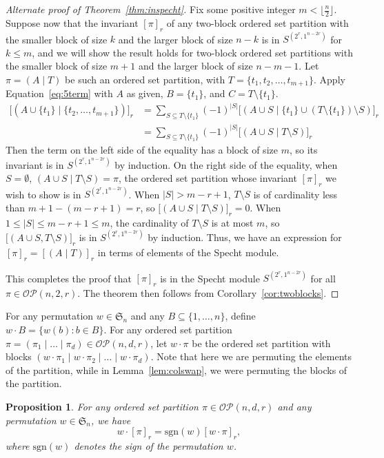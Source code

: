\documentclass[10pt]{amsart}
\theoremstyle{definition}
\theoremstyle{plain}
\theoremstyle{plain}
\newtheorem{proposition}[cdrthm]{Proposition}
\theoremstyle{definition}
\theoremstyle{remark}
\theoremstyle{plain}
\theoremstyle{plain}
\theoremstyle{plain}
\numberwithin{equation}{section}
\newcommand{\sgn}{\mathrm{sgn}}
\newcommand{\ordsetpart}{\mathcal{OP}}
\begin{document}
\begin{proof}[Alternate proof of Theorem~\ref{thm:inspecht}]
Fix some positive integer $m< \lfloor\frac{n}{2}\rfloor$. Suppose now that the invariant $[\pi]_r$ of any two-block ordered set partition with the smaller block of size $k$ and the larger block of size $n-k$ is in $S^{(2^r,1^{n-2r})}$ for $k\leq m$, and we will show the result holds for two-block ordered set partitions with the smaller block of size $m+1$ and the larger block of size $n-m-1$. 
Let $\pi=(A \mid T)$ be such an ordered set partition, with $T=\{t_1,t_2,\ldots,t_{m+1}\}$.  
Apply Equation~\eqref{eq:5term} with $A$ as given, $B=\{t_1\}$, and $C=T\setminus \{t_1\}$.
\begin{align*}
\big[(A\cup \{t_1\} \mid \{t_2,\ldots,t_{m+1}\})\big]_r&=\sum_{S\subseteq T\setminus \{t_1\}}(-1)^{|S|}\big[(A\cup S \mid \{t_1\}\cup (T\setminus \{t_1\})\setminus S)\big]_r\\
&=\sum_{S\subseteq T\setminus \{t_1\}}(-1)^{|S|}\big[(A\cup S \mid T\setminus S ) \big]_r
\end{align*}
Then the term on the left side of the equality has a block of size $m$, so its invariant is in $S^{(2^r,1^{n-2r})}$ by induction. On the right side of the equality, when $S=\emptyset$, $(A\cup S\mid T\setminus S)=\pi$, the ordered set partition whose invariant $[\pi]_r$ we wish to show is in $S^{(2^r,1^{n-2r})}$. When $|S|>m-r+1$, $T\setminus S$ is of cardinality less than $m+1-(m-r+1)=r$, so $\big[(A\cup S\mid T\setminus S)\big]_r=0$. When $1\leq |S|\leq m-r+1\leq m$, the cardinality of $T\setminus S$ is at most $m$, so $\big[(A\cup S,T\setminus S)\big]_r$ is in $S^{(2^r,1^{n-2r})}$ by induction. Thus, we have an expression for $[\pi]_r=[(A\mid T)]_r$ in terms of elements of the Specht module. 

This completes the proof that $[\pi]_r$ is in the Specht module $S^{(2^r,1^{n-2 r})}$ for all $\pi\in\ordsetpart(n,2,r)$. The theorem then follows from Corollary~\ref{cor:twoblocks}.
\end{proof}

For any permutation $w \in \mathfrak{S}_n$ and any $B \subseteq \{1, \dots, n\}$, define $w \cdot B = \{ w(b) : b \in B \}$.
For any ordered set partition $\pi = (\pi_1\mid  \dots\mid \pi_d ) \in \ordsetpart(n,d,r)$, let $w \cdot \pi$ be the ordered set partition with blocks $( w \cdot \pi_1\mid w \cdot \pi_2\mid \dots\mid w \cdot \pi_d )$. Note that here we are permuting the elements of the partition, while in Lemma~\ref{lem:colswap}, we were permuting the blocks of the partition.


\begin{proposition}
\label{prop:any_perm}
For any ordered set partition $\pi \in \ordsetpart(n,d,r)$ and any permutation $w \in \mathfrak{S}_n$, we have 
\[
w \cdot [\pi]_r = \sgn(w) [w \cdot \pi]_r,
\]
where $\sgn(w)$ denotes the sign of the permutation $w$.
\end{proposition}
\end{document}
